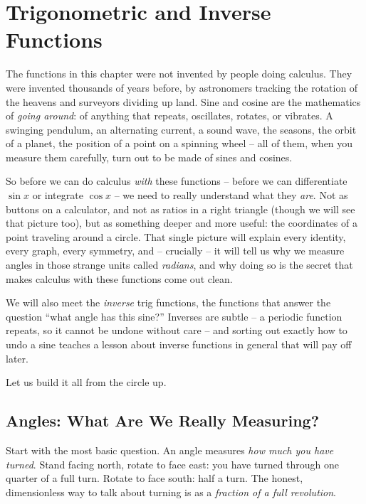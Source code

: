 \chapter{Trigonometric and Inverse Functions}

The functions in this chapter were not invented by people doing calculus. They were invented thousands of years before, by astronomers tracking the rotation of the heavens and surveyors dividing up land. Sine and cosine are the mathematics of \emph{going around}: of anything that repeats, oscillates, rotates, or vibrates. A swinging pendulum, an alternating current, a sound wave, the seasons, the orbit of a planet, the position of a point on a spinning wheel -- all of them, when you measure them carefully, turn out to be made of sines and cosines.

So before we can do calculus \emph{with} these functions -- before we can differentiate $\sin x$ or integrate $\cos x$ -- we need to really understand what they \emph{are}. Not as buttons on a calculator, and not as ratios in a right triangle (though we will see that picture too), but as something deeper and more useful: the coordinates of a point traveling around a circle. That single picture will explain every identity, every graph, every symmetry, and -- crucially -- it will tell us why we measure angles in those strange units called \emph{radians}, and why doing so is the secret that makes calculus with these functions come out clean.

We will also meet the \emph{inverse} trig functions, the functions that answer the question ``what angle has this sine?'' Inverses are subtle -- a periodic function repeats, so it cannot be undone without care -- and sorting out exactly how to undo a sine teaches a lesson about inverse functions in general that will pay off later.

Let us build it all from the circle up.

\section{Angles: What Are We Really Measuring?}
\label{ch04:angles}

Start with the most basic question. An angle measures \emph{how much you have turned}. Stand facing north, rotate to face east: you have turned through one quarter of a full turn. Rotate to face south: half a turn. The honest, dimensionless way to talk about turning is as a \emph{fraction of a full revolution}.


